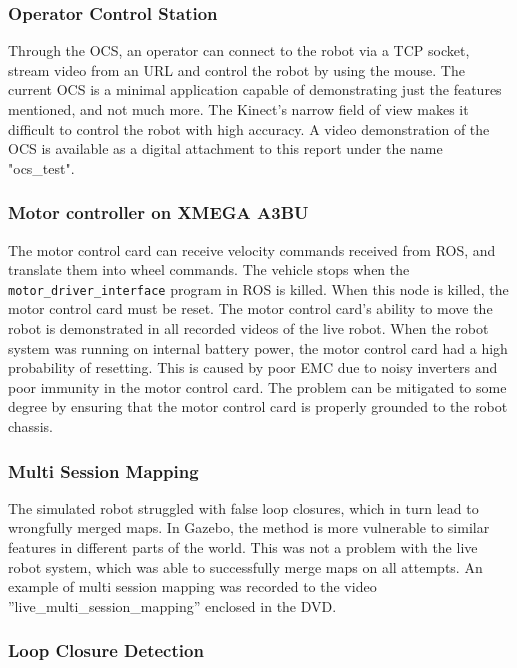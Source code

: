 \subsubsection{Operator Control Station}

Through the \ac{OCS}, an operator can connect to the robot via a TCP socket, stream video from an URL and control the robot by using the mouse. The current \ac{OCS} is a minimal application capable of demonstrating just the features mentioned, and not much more. The Kinect's narrow field of view makes it difficult to control the robot with high accuracy. A video demonstration of the \ac{OCS} is available as a digital attachment to this report under the name "ocs\_test".

\subsubsection{Motor controller on XMEGA A3BU}

The motor control card can receive velocity commands received from \ac{ROS}, and translate them into wheel commands. The vehicle stops when the \texttt{motor\_driver\_interface} program in \ac{ROS} is killed. When this node is killed, the motor control card must be reset. The motor control card's ability to move the robot is demonstrated in all recorded videos of the live robot. When the robot system was running on internal battery power, the motor control card had a high probability of resetting. This is caused by poor \ac{EMC} due to noisy inverters and poor immunity in the motor control card. The problem can be mitigated to some degree by ensuring that the motor control card is properly grounded to the robot chassis.

\subsubsection{Multi Session Mapping}

The simulated robot struggled with false loop closures, which in turn lead to wrongfully merged maps. In Gazebo, the method is more vulnerable to similar features in different parts of the world. This was not a problem with the live robot system, which was able to successfully merge maps on all attempts. An example of multi session mapping was recorded to the video ''live\_multi\_session\_mapping'' enclosed in the DVD.

\subsubsection{Loop Closure Detection}

